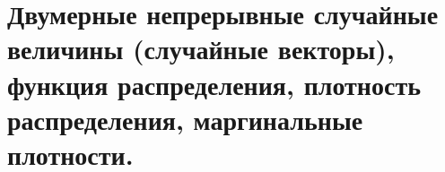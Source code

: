 \documentclass[polytech/stats/exam-2023/stats-exam-2023.tex]{subfiles}
\begin{document}
\section{Двумерные непрерывные случайные величины (случайные векторы), функция распределения, плотность распределения, маргинальные плотности.}
\end{document}
